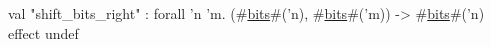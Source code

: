 val "shift_bits_right" : forall 'n 'm. (#\hyperref[zbits]{bits}#('n), #\hyperref[zbits]{bits}#('m)) -> #\hyperref[zbits]{bits}#('n) effect {undef}
